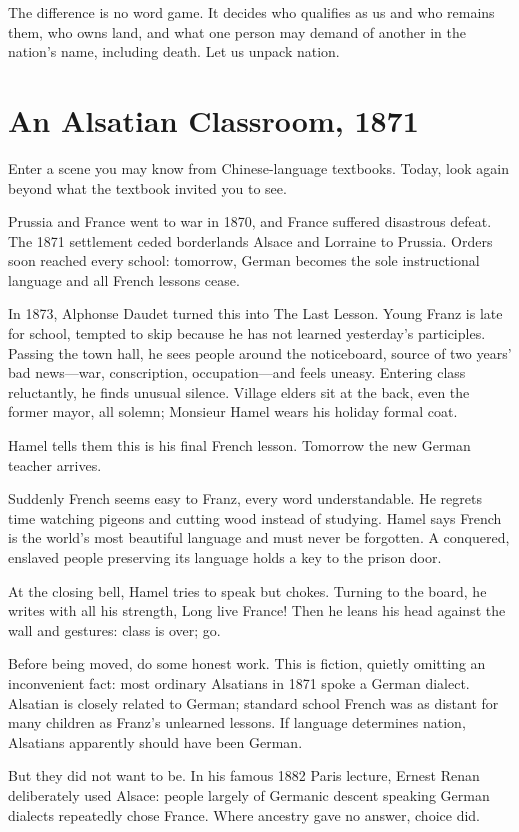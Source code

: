 The difference is no word game. It decides who qualifies as us and who remains them, who owns land, and what one person may demand of another in the nation's name, including death. Let us unpack nation.

\section{An Alsatian Classroom, 1871}
Enter a scene you may know from Chinese-language textbooks. Today, look again beyond what the textbook invited you to see.

Prussia and France went to war in 1870, and France suffered disastrous defeat. The 1871 settlement ceded borderlands Alsace and Lorraine to Prussia. Orders soon reached every school: tomorrow, German becomes the sole instructional language and all French lessons cease.

In 1873, Alphonse Daudet turned this into The Last Lesson. Young Franz is late for school, tempted to skip because he has not learned yesterday's participles. Passing the town hall, he sees people around the noticeboard, source of two years' bad news---war, conscription, occupation---and feels uneasy. Entering class reluctantly, he finds unusual silence. Village elders sit at the back, even the former mayor, all solemn; Monsieur Hamel wears his holiday formal coat.

Hamel tells them this is his final French lesson. Tomorrow the new German teacher arrives.

Suddenly French seems easy to Franz, every word understandable. He regrets time watching pigeons and cutting wood instead of studying. Hamel says French is the world's most beautiful language and must never be forgotten. A conquered, enslaved people preserving its language holds a key to the prison door.

At the closing bell, Hamel tries to speak but chokes. Turning to the board, he writes with all his strength, Long live France! Then he leans his head against the wall and gestures: class is over; go.

Before being moved, do some honest work. This is fiction, quietly omitting an inconvenient fact: most ordinary Alsatians in 1871 spoke a German dialect. Alsatian is closely related to German; standard school French was as distant for many children as Franz's unlearned lessons. If language determines nation, Alsatians apparently should have been German.

But they did not want to be. In his famous 1882 Paris lecture, Ernest Renan deliberately used Alsace: people largely of Germanic descent speaking German dialects repeatedly chose France. Where ancestry gave no answer, choice did.

